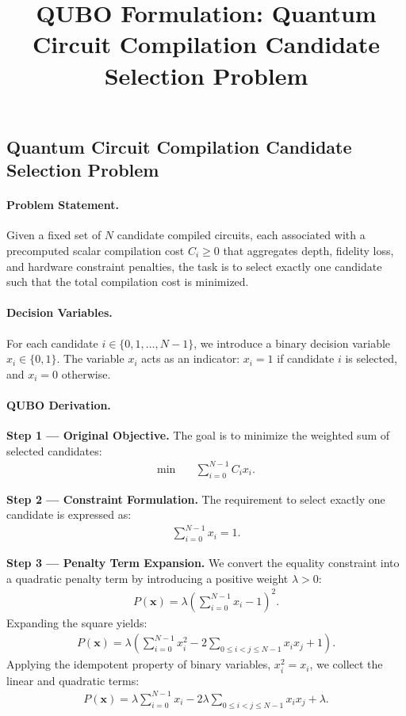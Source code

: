 \documentclass[12pt]{article}
\title{QUBO Formulation: Quantum Circuit Compilation Candidate Selection Problem}
\date{}
\begin{document}
\maketitle

\subsection*{Quantum Circuit Compilation Candidate Selection Problem}

\paragraph{Problem Statement.}
Given a fixed set of $N$ candidate compiled circuits, each associated with a precomputed scalar compilation cost $C_i \geq 0$ that aggregates depth, fidelity loss, and hardware constraint penalties, the task is to select exactly one candidate such that the total compilation cost is minimized.

\paragraph{Decision Variables.}
For each candidate $i \in \{0, 1, \dots, N-1\}$, we introduce a binary decision variable $x_i \in \{0, 1\}$. The variable $x_i$ acts as an indicator: $x_i = 1$ if candidate $i$ is selected, and $x_i = 0$ otherwise.

\paragraph{QUBO Derivation.}
\textbf{Step 1 --- Original Objective.} The goal is to minimize the weighted sum of selected candidates:
\begin{align}
    \min \quad & \sum_{i=0}^{N-1} C_i x_i.
\end{align}

\textbf{Step 2 --- Constraint Formulation.} The requirement to select exactly one candidate is expressed as:
\begin{align}
    \sum_{i=0}^{N-1} x_i = 1.
\end{align}

\textbf{Step 3 --- Penalty Term Expansion.} We convert the equality constraint into a quadratic penalty term by introducing a positive weight $\lambda > 0$:
\begin{align}
    P(\mathbf{x}) = \lambda \left( \sum_{i=0}^{N-1} x_i - 1 \right)^2.
\end{align}
Expanding the square yields:
\begin{align}
    P(\mathbf{x}) = \lambda \left( \sum_{i=0}^{N-1} x_i^2 - 2 \sum_{0 \leq i < j \leq N-1} x_i x_j + 1 \right).
\end{align}
Applying the idempotent property of binary variables, $x_i^2 = x_i$, we collect the linear and quadratic terms:
\begin{align}
    P(\mathbf{x}) = \lambda \sum_{i=0}^{N-1} x_i - 2\lambda \sum_{0 \leq i < j \leq N-1} x_i x_j + \lambda.
\end{align}
\end{document}
